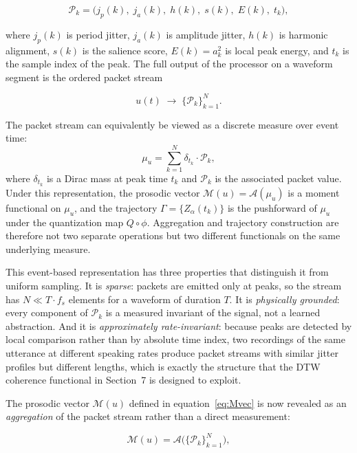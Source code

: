 \documentclass[12pt, a4paper]{article}
\begin{document}
\begin{equation}
\mathcal{P}_k = \bigl(j_p(k),\; j_a(k),\; h(k),\; s(k),\; E(k),\; t_k\bigr),
\label{eq:packet}
\end{equation}

where $j_p(k)$ is period jitter, $j_a(k)$ is amplitude jitter, $h(k)$ is harmonic alignment, $s(k)$ is the salience score, $E(k) = a_k^2$ is local peak energy, and $t_k$ is the sample index of the peak. The full output of the processor on a waveform segment is the ordered packet stream

\begin{equation}
u(t) \;\longrightarrow\; \{\mathcal{P}_k\}_{k=1}^N.
\label{eq:stream}
\end{equation}

The packet stream can equivalently be viewed as a discrete measure over event time:
\begin{equation}
\mu_u = \sum_{k=1}^N \delta_{t_k} \cdot \mathcal{P}_k,
\label{eq:measure}
\end{equation}
where $\delta_{t_k}$ is a Dirac mass at peak time $t_k$ and $\mathcal{P}_k$ is the associated packet value. Under this representation, the prosodic vector $\mathcal{M}(u) = \mathcal{A}(\mu_u)$ is a moment functional on $\mu_u$, and the trajectory $\Gamma = \{Z_\alpha(t_k)\}$ is the pushforward of $\mu_u$ under the quantization map $Q \circ \phi$. Aggregation and trajectory construction are therefore not two separate operations but two different functionals on the same underlying measure.

This event-based representation has three properties that distinguish it from uniform sampling. It is \emph{sparse}: packets are emitted only at peaks, so the stream has $N \ll T \cdot f_s$ elements for a waveform of duration $T$. It is \emph{physically grounded}: every component of $\mathcal{P}_k$ is a measured invariant of the signal, not a learned abstraction. And it is \emph{approximately rate-invariant}: because peaks are detected by local comparison rather than by absolute time index, two recordings of the same utterance at different speaking rates produce packet streams with similar jitter profiles but different lengths, which is exactly the structure that the DTW coherence functional in Section~7 is designed to exploit.

The prosodic vector $\mathcal{M}(u)$ defined in equation~\eqref{eq:Mvec} is now revealed as an \emph{aggregation} of the packet stream rather than a direct measurement:

\begin{equation}
\mathcal{M}(u) = \mathcal{A}\bigl(\{\mathcal{P}_k\}_{k=1}^N\bigr),
\label{eq:agg}
\end{equation}
\end{document}
